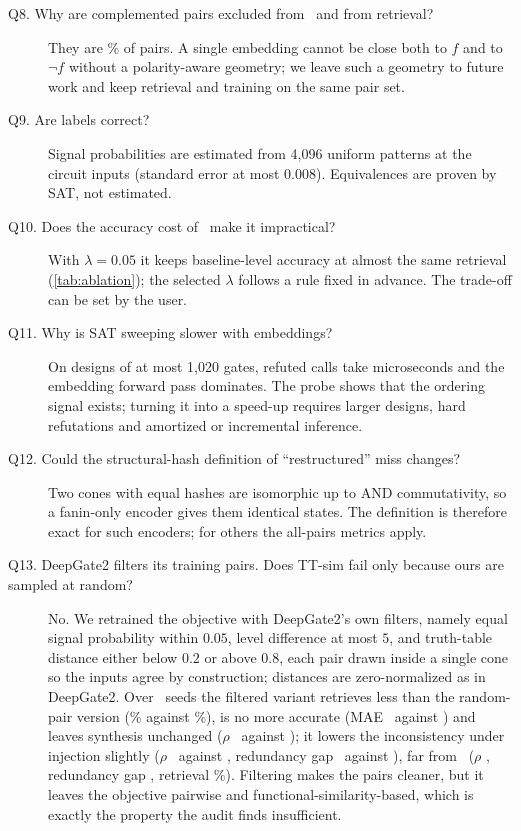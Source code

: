 \begin{description}
\item[Q8. Why are complemented pairs excluded from \ours\ and from retrieval?] They are \ComplPct\% of pairs. A single
embedding cannot be close both to $f$ and to $\neg f$ without a polarity-aware geometry; we leave such a geometry
to future work and keep retrieval and training on the same pair set.

\item[Q9. Are labels correct?] Signal probabilities are estimated from 4{,}096 uniform patterns at the circuit inputs
(standard error at most 0.008). Equivalences are proven by SAT, not estimated.

\item[Q10. Does the accuracy cost of \ours\ make it impractical?] With $\lambda=0.05$ it keeps baseline-level
accuracy at almost the same retrieval (\cref{tab:ablation}); the selected $\lambda$ follows a rule fixed in advance.
The trade-off can be set by the user.

\item[Q11. Why is SAT sweeping slower with embeddings?] On designs of at most 1{,}020 gates, refuted calls take
microseconds and the embedding forward pass dominates. The probe shows that the ordering signal exists; turning it
into a speed-up requires larger designs, hard refutations and amortized or incremental inference.

\item[Q12. Could the structural-hash definition of ``restructured'' miss changes?] Two cones with equal hashes are
isomorphic up to AND commutativity, so a fanin-only encoder gives them identical states. The definition is therefore
exact for such encoders; for others the all-pairs metrics apply.

\item[Q13. DeepGate2 filters its training pairs. Does TT-sim fail only because ours are sampled at random?] No. We
retrained the objective with DeepGate2's own filters, namely equal signal probability within $0.05$, level difference
at most $5$, and truth-table distance either below $0.2$ or above $0.8$, each pair drawn inside a single cone so the
inputs agree by construction; distances are zero-normalized as in DeepGate2. Over \TTFNSeeds\ seeds the filtered variant
retrieves less than the random-pair version (\TTFTopRS\% against \TTTopRS\%), is no more accurate (MAE \TTFMAE\ against
\TTMAE) and leaves synthesis unchanged ($\rho$ \TTFRhoSyn\ against \TTRhoSyn); it lowers the inconsistency under
injection slightly ($\rho$ \TTFRhoInj\ against \TTRhoInj, redundancy gap \TTFDInj\ against \TTDInj), far from \ours\
($\rho$ \OursRhoInj, redundancy gap \OursDInj, retrieval \OursTopRS\%). Filtering makes
the pairs cleaner, but it leaves the objective pairwise and functional-similarity-based, which is exactly the property
the audit finds insufficient.


\end{description}
